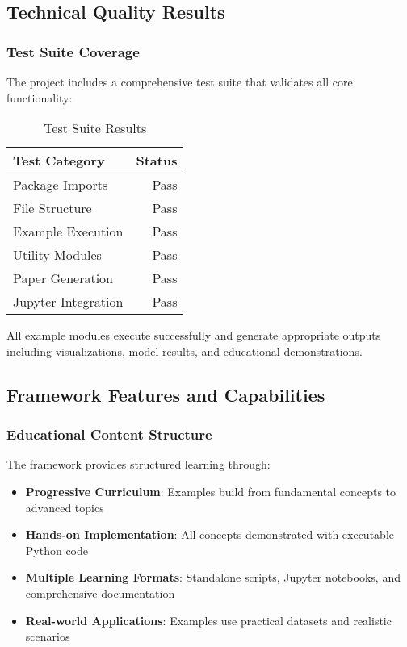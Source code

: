 \subsection{Technical Quality Results}

\subsubsection{Test Suite Coverage}

The project includes a comprehensive test suite that validates all core functionality:

\begin{table}[H]
\centering
\caption{Test Suite Results}
\label{tab:test-results}
\begin{tabular}{@{}lr@{}}
\toprule
\textbf{Test Category} & \textbf{Status} \\
\midrule
Package Imports & Pass \\
File Structure & Pass \\
Example Execution & Pass \\
Utility Modules & Pass \\
Paper Generation & Pass \\
Jupyter Integration & Pass \\
\bottomrule
\end{tabular}
\end{table}

All example modules execute successfully and generate appropriate outputs including visualizations, model results, and educational demonstrations.

\subsection{Framework Features and Capabilities}

\subsubsection{Educational Content Structure}

The framework provides structured learning through:

\begin{itemize}
    \item \textbf{Progressive Curriculum}: Examples build from fundamental concepts to advanced topics
    \item \textbf{Hands-on Implementation}: All concepts demonstrated with executable Python code
    \item \textbf{Multiple Learning Formats}: Standalone scripts, Jupyter notebooks, and comprehensive documentation
    \item \textbf{Real-world Applications}: Examples use practical datasets and realistic scenarios
\end{itemize}


